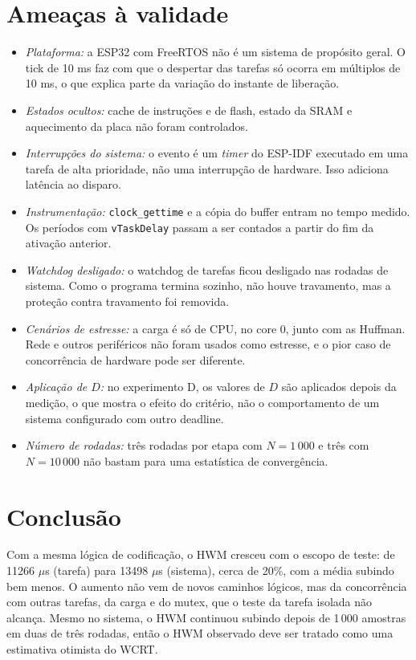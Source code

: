 \documentclass[conference,a4paper]{IEEEtran}
\begin{document}
\section{Ameaças à validade}
\begin{itemize}
\item \emph{Plataforma:} a ESP32 com FreeRTOS não é um sistema de propósito geral. O tick de 10 ms faz com que o despertar das tarefas só ocorra em múltiplos de 10 ms, o que explica parte da variação do instante de liberação.
\item \emph{Estados ocultos:} cache de instruções e de flash, estado da SRAM e aquecimento da placa não foram controlados.
\item \emph{Interrupções do sistema:} o evento é um \emph{timer} do ESP-IDF executado em uma tarefa de alta prioridade, não uma interrupção de hardware. Isso adiciona latência ao disparo.
\item \emph{Instrumentação:} \texttt{clock\_gettime} e a cópia do buffer entram no tempo medido. Os períodos com \texttt{vTaskDelay} passam a ser contados a partir do fim da ativação anterior.
\item \emph{Watchdog desligado:} o watchdog de tarefas ficou desligado nas rodadas de sistema. Como o programa termina sozinho, não houve travamento, mas a proteção contra travamento foi removida.
\item \emph{Cenários de estresse:} a carga é só de CPU, no core 0, junto com as Huffman. Rede e outros periféricos não foram usados como estresse, e o pior caso de concorrência de hardware pode ser diferente.
\item \emph{Aplicação de $D$:} no experimento D, os valores de $D$ são aplicados depois da medição, o que mostra o efeito do critério, não o comportamento de um sistema configurado com outro deadline.
\item \emph{Número de rodadas:} três rodadas por etapa com $N = 1\,000$ e três com $N = 10\,000$ não bastam para uma estatística de convergência.
\end{itemize}

\section{Conclusão}
Com a mesma lógica de codificação, o HWM cresceu com o escopo de teste: de 11266 $\mu$s (tarefa) para 13498 $\mu$s (sistema), cerca de 20\%, com a média subindo bem menos. O aumento não vem de novos caminhos lógicos, mas da concorrência com outras tarefas, da carga e do mutex, que o teste da tarefa isolada não alcança. Mesmo no sistema, o HWM continuou subindo depois de 1\,000 amostras em duas de três rodadas, então o HWM observado deve ser tratado como uma estimativa otimista do WCRT.
\end{document}
